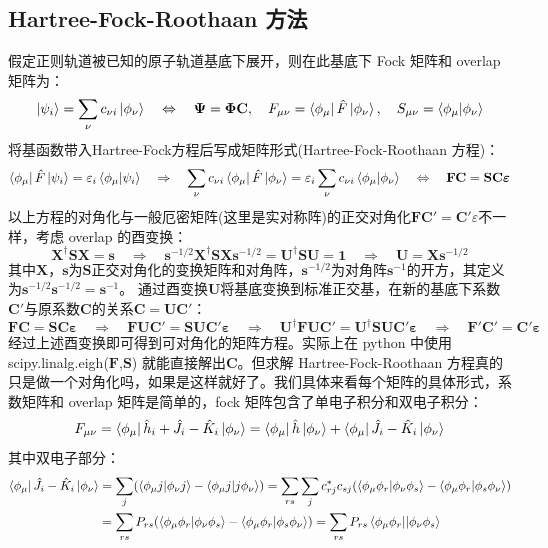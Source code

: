 \subsection{Hartree-Fock-Roothaan 方法}
假定正则轨道被已知的原子轨道基底下展开，则在此基底下 Fock 矩阵和 overlap 矩阵为：
\[\ket{\psi_i}=\sum_{\nu}c_{\nu i}\ket{\phi_{\nu}} \quad \Leftrightarrow \quad \bm{\Psi}=\bm{\Phi}\mathbf{C}, \quad F_{\mu\nu}=\bra{\phi_{\mu}}\hat{F}\ket{\phi_{\nu}}, \quad S_{\mu\nu}=\bra{\phi_{{\mu}}}\ket{\phi_{\nu}}\]
将基函数带入Hartree-Fock方程后写成矩阵形式(Hartree-Fock-Roothaan 方程)：
\[\bra{\phi_{\mu}}\hat{F}\ket{\psi_i}=\varepsilon_i\bra{\phi_{\mu}}\ket{\psi_i} \quad \Rightarrow \quad \sum_{\nu}c_{\nu i}\bra{\phi_{\mu}}\hat{F}\ket{\phi_{\nu}}=\varepsilon_i\sum_{\nu}c_{\nu i}\bra{\phi_{\mu}}\ket{\phi_{\nu}} \quad \Leftrightarrow \quad \mathbf{F}\mathbf{C}=\mathbf{S}\mathbf{C}\bm{\varepsilon}\]
以上方程的对角化与一般厄密矩阵(这里是实对称阵)的正交对角化$\mathbf{F}\mathbf{C}'=\mathbf{C}'\varepsilon$不一样，考虑 overlap 的酉变换：
\[\mathbf{X}^{\dagger}\mathbf{S}\mathbf{X}=\mathbf{s} \quad \Rightarrow \quad \mathbf{s}^{-1/2}\mathbf{X}^{\dagger}\mathbf{S}\mathbf{X}\mathbf{s}^{-1/2}=\mathbf{U}^{\dagger}\mathbf{S}\mathbf{U}=\mathbf{1} \quad \Rightarrow \quad \mathbf{U}=\mathbf{X}\mathbf{s}^{-1/2}\]
其中$\mathbf{X}$，$\mathbf{s}$为$\mathbf{S}$正交对角化的变换矩阵和对角阵，$\mathbf{s}^{-1/2}$为对角阵$\mathbf{s}^{-1}$的开方，其定义为$\mathbf{s}^{-1/2}\mathbf{s}^{-1/2}=\mathbf{s}^{-1}$。
通过酉变换$\mathbf{U}$将基底变换到标准正交基，在新的基底下系数$\mathbf{C}'$与原系数$\mathbf{C}$的关系$\mathbf{C}=\mathbf{U}\mathbf{C}'$：
\[\mathbf{F}\mathbf{C}=\mathbf{S}\mathbf{C}\bm{\varepsilon} \quad \Rightarrow \quad \mathbf{F}\mathbf{U}\mathbf{C}'=\mathbf{S}\mathbf{U}\mathbf{C}'\bm{\varepsilon} \quad \Rightarrow \quad \mathbf{U}^{\dagger}\mathbf{F}\mathbf{U}\mathbf{C}'=\mathbf{U}^{\dagger}\mathbf{S}\mathbf{U}\mathbf{C}'\bm{\varepsilon}\quad \Rightarrow \quad \mathbf{F}'\mathbf{C}'=\mathbf{C}'\bm{\varepsilon}\]
经过上述酉变换即可得到可对角化的矩阵方程。实际上在 python 中使用 scipy.linalg.eigh($\mathbf{F}$,$\mathbf{S}$) 就能直接解出$\mathbf{C}$。但求解 Hartree-Fock-Roothaan 方程真的只是做一个对角化吗，如果是这样就好了。我们具体来看每个矩阵的具体形式，系数矩阵和 overlap 矩阵是简单的，fock 矩阵包含了单电子积分和双电子积分：
\[F_{\mu\nu} = \bra{\phi_{\mu}}\hat{h}_i+\hat{J}_i-\hat{K}_i\ket{\phi_{\nu}}=\bra{\phi_{\mu}}\hat{h}\ket{\phi_{\nu}}+\bra{\phi_{\mu}}\hat{J}_i-\hat{K}_i\ket{\phi_{\nu}}\]
其中双电子部分：
\begin{equation*}
\begin{aligned}
\bra{\phi_{\mu}}\hat{J}_i-\hat{K}_i\ket{\phi_{\nu}}&=\sum_{j}(\bra{\phi_{\mu}j}\ket{\phi_{\nu}j}-\bra{\phi_{\mu}j}\ket{j\phi_{\nu}})=\sum_{rs}\sum_{j}c_{rj}^*c_{sj}(\bra{\phi_{\mu}\phi_r}\ket{\phi_{\nu}\phi_s}-\bra{\phi_{\mu}\phi_r}\ket{\phi_s\phi_{\nu}})\\
&=\sum_{rs}P_{rs}(\bra{\phi_{\mu}\phi_r}\ket{\phi_{\nu}\phi_s}-\bra{\phi_{\mu}\phi_r}\ket{\phi_s\phi_{\nu}})=\sum_{rs}P_{rs}\bra{\phi_{\mu}\phi_r}\ket{|\phi_{\nu}\phi_s}\\
\end{aligned}
\end{equation*}
